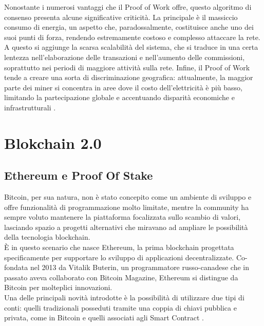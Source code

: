 Nonostante i numerosi vantaggi che il Proof of Work offre, questo algoritmo di consenso presenta alcune significative criticità. La principale è il massiccio consumo di energia, un aspetto che, paradossalmente, costituisce anche uno dei suoi punti di forza, rendendo estremamente costoso e complesso attaccare la rete.
A questo si aggiunge la scarsa scalabilità del sistema, che si traduce in una certa lentezza nell’elaborazione delle transazioni e nell’aumento delle commissioni, soprattutto nei periodi di maggiore attività sulla rete. Infine, il Proof of Work tende a creare una sorta di discriminazione geografica: attualmente, la maggior parte dei miner si concentra in aree dove il costo dell’elettricità è più basso, limitando la partecipazione globale e accentuando disparità economiche e infrastrutturali \cite{Blockchain_tecnologia_e_applicazioni_per_il_business}.

\section{Blokchain 2.0}

\subsection{Ethereum e Proof Of Stake}
Bitcoin, per sua natura, non è stato concepito come un ambiente di sviluppo e offre funzionalità di programmazione molto limitate, mentre la community ha sempre voluto mantenere la piattaforma focalizzata sullo scambio di valori, lasciando spazio a progetti alternativi che miravano ad ampliare le possibilità della tecnologia blockchain.
\\È in questo scenario che nasce Ethereum, la prima blockchain progettata specificamente per supportare lo sviluppo di applicazioni decentralizzate. Co-fondata nel 2013 da Vitalik Buterin, un programmatore russo-canadese che in passato aveva collaborato con Bitcoin Magazine, Ethereum si distingue da Bitcoin per molteplici innovazioni.
\\Una delle principali novità introdotte è la possibilità di utilizzare due tipi di conti: quelli tradizionali posseduti tramite una coppia di chiavi pubblica e privata, come in Bitcoin e quelli associati agli Smart Contract \cite{Blockchain_guida_allecosistema}. 
